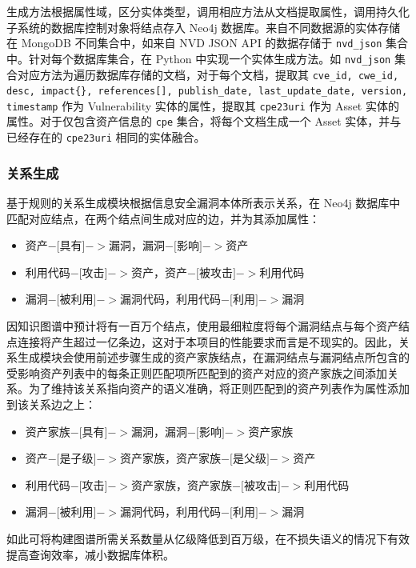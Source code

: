 \documentclass[a4paper,AutoFakeBold,oneside,12pt]{book}
\begin{document}
生成方法根据属性域，区分实体类型，调用相应方法从文档提取属性，调用持久化子系统的数据库控制对象将结点存入 Neo4j 数据库。来自不同数据源的实体存储在 MongoDB 不同集合中，如来自 NVD JSON API 的数据存储于 \lstinline|nvd_json| 集合中。针对每个数据库集合，在 Python 中实现一个实体生成方法。如 \lstinline|nvd_json| 集合对应方法为遍历数据库存储的文档，对于每个文档，提取其 \lstinline|cve_id, cwe_id, desc, impact{}, references[], publish_date, last_update_date, version, timestamp| 作为 Vulnerability 实体的属性，提取其 \lstinline|cpe23uri| 作为 Asset 实体的属性。对于仅包含资产信息的 \lstinline|cpe| 集合，将每个文档生成一个 Asset 实体，并与已经存在的 \lstinline|cpe23uri| 相同的实体融合。

\subsubsection{关系生成\label{关系生成}}

基于规则的关系生成模块根据信息安全漏洞本体所表示关系，在 Neo4j 数据库中匹配对应结点，在两个结点间生成对应的边，并为其添加属性：
\begin{itemize}
	\item 资产$-[$具有$]->$漏洞，漏洞$-[$影响$]->$资产
	\item 利用代码$-[$攻击$]->$资产，资产$-[$被攻击$]->$利用代码
	\item 漏洞$-[$被利用$]->$漏洞代码，利用代码$-[$利用$]->$漏洞
\end{itemize}

因知识图谱中预计将有一百万个结点，使用最细粒度将每个漏洞结点与每个资产结点连接将产生超过一亿条边，这对于本项目的性能要求而言是不现实的。因此，关系生成模块会使用前述步骤生成的资产家族结点，在漏洞结点与漏洞结点所包含的受影响资产列表中的每条正则匹配项所匹配到的资产对应的资产家族之间添加关系。为了维持该关系指向资产的语义准确，将正则匹配到的资产列表作为属性添加到该关系边之上：
\begin{itemize}
	\item 资产家族$-[$具有$]->$漏洞，漏洞$-[$影响$]->$资产家族
	\item 资产$-[$是子级$]->$资产家族，资产家族$-[$是父级$]->$资产
	\item 利用代码$-[$攻击$]->$资产家族，资产家族$-[$被攻击$]->$利用代码
	\item 漏洞$-[$被利用$]->$漏洞代码，利用代码$-[$利用$]->$漏洞
\end{itemize}

如此可将构建图谱所需关系数量从亿级降低到百万级，在不损失语义的情况下有效提高查询效率，减小数据库体积。
\end{document}
